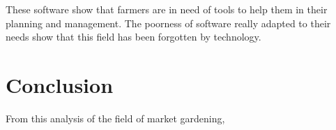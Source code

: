 These software show that farmers are in need of tools to help them in their planning and management. The poorness of software really adapted to their needs show that this field has been forgotten by technology.


\section{Conclusion}

From this analysis of the field of market gardening, 
